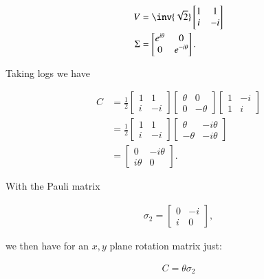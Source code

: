 \begin{align}\label{eqn:rotationUnitary:7}
V &= \inv{\sqrt{2}}
\begin{bmatrix}
1 & 1 \\
i & -i
\end{bmatrix} \\
\Sigma &=
\begin{bmatrix}
e^{i\theta} & 0 \\
0 & e^{-i\theta}
\end{bmatrix}.
\end{align}

Taking logs we have

\begin{align*}
C
&=
\frac{1}{2}
\begin{bmatrix}
1 & 1 \\
i & -i
\end{bmatrix}
\begin{bmatrix}
\theta & 0 \\
0 & -\theta
\end{bmatrix}
\begin{bmatrix}
1 & -i \\
1 & i
\end{bmatrix} \\
&=
\frac{1}{2}
\begin{bmatrix}
1 & 1 \\
i & -i
\end{bmatrix}
\begin{bmatrix}
\theta  & -i\theta \\
-\theta & -i\theta
\end{bmatrix}  \\
&=
\begin{bmatrix}
0 & -i\theta \\
i\theta & 0
\end{bmatrix}.
\end{align*}

With the Pauli matrix

\begin{align}\label{eqn:rotationUnitary:8a}
\sigma_2 =
\begin{bmatrix}
0 & -i \\
i & 0
\end{bmatrix},
\end{align}

we then have for an $x,y$ plane rotation matrix just:

\begin{align}\label{eqn:rotationUnitary:8}
C = \theta \sigma_2
\end{align}

